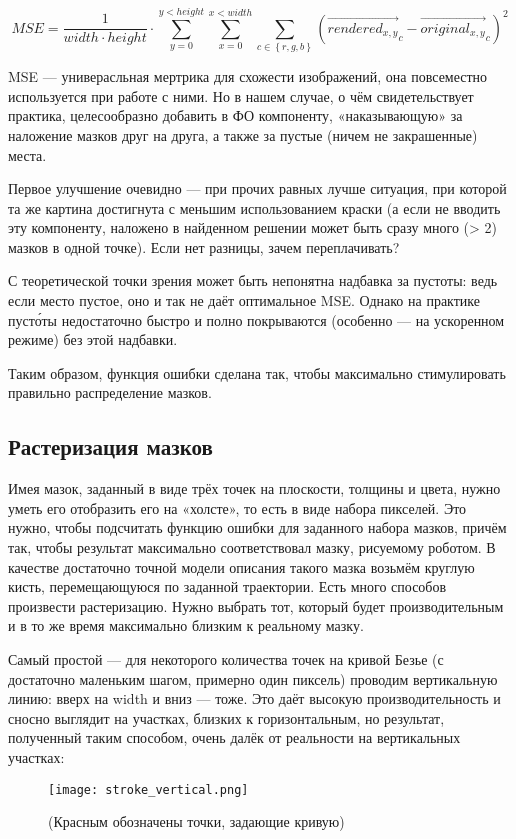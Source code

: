 \begin{equation}\label{eq:equation}
    MSE = \frac{1}{width \cdot height} \cdot \sum_{y = 0}^{y < height} { \sum_{x = 0}^{x < width} { \sum_{c \in  \left\{ r, g, b \right\} } { \left( {\overrightarrow {rendered_{x, y}}}_c - {\overrightarrow{original_{x, y}}}_c\right)^2 }}}
\end{equation}

MSE — универасльная мертрика для схожести изображений, она повсеместно используется при работе с ними.
Но в нашем случае, о чём свидетельствует практика, целесообразно добавить в ФО компоненту, «наказывающую» за наложение мазков друг на друга, а также за пустые (ничем не закрашенные) места.

Первое улучшение очевидно — при прочих равных лучше ситуация, при которой та же картина достигнута с меньшим использованием краски
(а если не вводить эту компоненту, наложено в найденном решении может быть сразу много (> 2) мазков в одной точке).
Если нет разницы, зачем переплачивать?

С теоретической точки зрения может быть непонятна надбавка за пустоты: ведь если место пустое, оно и так не даёт оптимальное MSE.
Однако на практике пусто́ты недостаточно быстро и полно покрываются (особенно — на ускоренном режиме) без этой надбавки.

Таким образом, функция ошибки сделана так, чтобы максимально стимулировать правильно распределение мазков.

\subsection{Растеризация мазков}\label{subsec:rasterization}
Имея мазок, заданный в виде трёх точек на плоскости, толщины и цвета, нужно уметь его отобразить его на «холсте», то есть в виде набора пикселей.
Это нужно, чтобы подсчитать функцию ошибки для заданного набора мазков,
причём так, чтобы результат максимально соответствовал мазку, рисуемому роботом.
В качестве достаточно точной модели описания такого мазка возьмём круглую кисть, перемещающуюся по заданной траектории.
Есть много способов произвести растеризацию.
Нужно выбрать тот, который будет производительным и в то же время максимально близким к реальному мазку.

Самый простой — для некоторого количества точек на кривой Безье (с достаточно маленьким шагом, примерно один пиксель) проводим вертикальную линию: вверх на width и  вниз — тоже.
Это даёт высокую производительность и сносно выглядит на участках, близких к горизонтальным, но результат, полученный таким способом, очень далёк от реальности на вертикальных участках:
\begin{figure}[h!]
    \centering
    \texttt{[image: stroke\_vertical.png]}
    \caption{(Красным обозначены точки, задающие кривую)}
    \label{fig:vertical_stroke}
\end{figure}
\FloatBarrier


